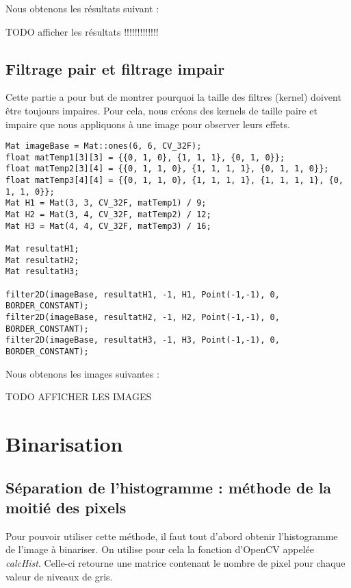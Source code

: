 \documentclass{article}
\begin{document}
 Nous obtenons les résultats suivant : 

 TODO afficher les résultats !!!!!!!!!!!!!

 \subsection{Filtrage pair et filtrage impair}
 Cette partie a pour but de montrer pourquoi la taille des filtres (kernel) doivent être toujours impaires. Pour cela, nous créons des kernels de taille paire et impaire que nous appliquons à une image pour observer leurs effets. \\

 \begin{lstlisting}
Mat imageBase = Mat::ones(6, 6, CV_32F);
float matTemp1[3][3] = {{0, 1, 0}, {1, 1, 1}, {0, 1, 0}};
float matTemp2[3][4] = {{0, 1, 1, 0}, {1, 1, 1, 1}, {0, 1, 1, 0}};
float matTemp3[4][4] = {{0, 1, 1, 0}, {1, 1, 1, 1}, {1, 1, 1, 1}, {0, 1, 1, 0}};
Mat H1 = Mat(3, 3, CV_32F, matTemp1) / 9;
Mat H2 = Mat(3, 4, CV_32F, matTemp2) / 12;
Mat H3 = Mat(4, 4, CV_32F, matTemp3) / 16;

Mat resultatH1;
Mat resultatH2;
Mat resultatH3;

filter2D(imageBase, resultatH1, -1, H1, Point(-1,-1), 0, BORDER_CONSTANT);
filter2D(imageBase, resultatH2, -1, H2, Point(-1,-1), 0, BORDER_CONSTANT);
filter2D(imageBase, resultatH3, -1, H3, Point(-1,-1), 0, BORDER_CONSTANT);
 \end{lstlisting} 

Nous obtenons les images suivantes : 

TODO AFFICHER LES IMAGES


 \section{Binarisation}

 \subsection{Séparation de l'histogramme : méthode de la moitié des pixels}
 Pour pouvoir utiliser cette méthode, il faut tout d'abord obtenir l'histogramme de l'image à binariser. On utilise pour cela la fonction d'OpenCV appelée \emph{calcHist}. Celle-ci retourne une matrice contenant le nombre de pixel pour chaque valeur de niveaux de gris.\\
\end{document}
